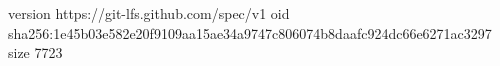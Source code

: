 version https://git-lfs.github.com/spec/v1
oid sha256:1e45b03e582e20f9109aa15ae34a9747c806074b8daafc924dc66e6271ac3297
size 7723
